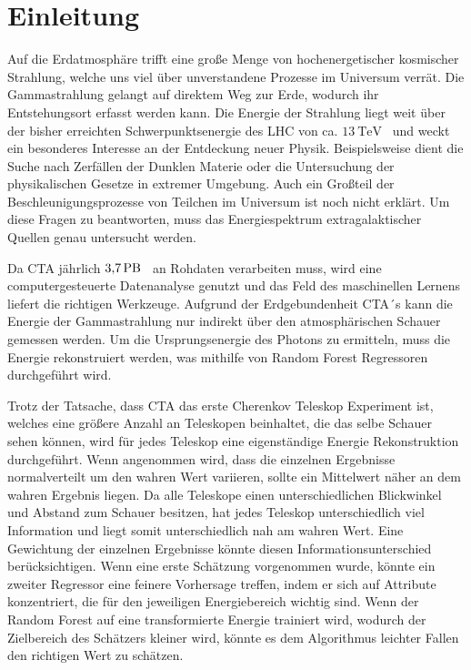 \chapter{Einleitung}

Auf die Erdatmosphäre trifft eine große Menge von hochenergetischer kosmischer Strahlung, welche uns viel über unverstandene
Prozesse im Universum verrät.
Die Gammastrahlung gelangt auf direktem Weg zur Erde, wodurch ihr Entstehungsort erfasst werden kann.
Die Energie der Strahlung liegt weit über der bisher erreichten Schwerpunktsenergie des LHC von ca. $\SI{13}{\tera\eV}$~\cite{LHC} und weckt
ein besonderes Interesse an der Entdeckung neuer Physik.
Beispielsweise dient die Suche nach Zerfällen der Dunklen Materie oder die Untersuchung der physikalischen Gesetze in extremer Umgebung.
Auch ein Großteil der Beschleunigungsprozesse von Teilchen im Universum ist noch nicht erklärt.
Um diese Fragen zu beantworten, muss das Energiespektrum extragalaktischer Quellen genau untersucht werden.

Da CTA jährlich $\SI{3.7}{\peta\byte}$~\cite{Rohdaten} an Rohdaten verarbeiten muss, wird eine computergesteuerte Datenanalyse
genutzt und das Feld des maschinellen Lernens liefert die richtigen Werkzeuge.
Aufgrund der Erdgebundenheit CTA´s kann die Energie der Gammastrahlung nur indirekt über den atmosphärischen Schauer gemessen
werden.
Um die Ursprungsenergie des Photons zu ermitteln, muss die Energie rekonstruiert werden, was mithilfe von Random Forest
Regressoren durchgeführt wird.

Trotz der Tatsache, dass CTA das erste Cherenkov Teleskop Experiment ist, welches eine größere Anzahl an Teleskopen beinhaltet,
die das selbe Schauer sehen können, wird für jedes Teleskop eine eigenständige
Energie Rekonstruktion durchgeführt.
Wenn angenommen wird, dass die einzelnen Ergebnisse normalverteilt um den wahren Wert variieren, sollte ein Mittelwert näher an dem wahren
Ergebnis liegen.
Da alle Teleskope einen unterschiedlichen Blickwinkel und Abstand zum Schauer besitzen, hat jedes Teleskop unterschiedlich viel Information und liegt somit
unterschiedlich nah am wahren Wert.
Eine Gewichtung der einzelnen Ergebnisse könnte diesen Informationsunterschied berücksichtigen.
Wenn eine erste Schätzung vorgenommen wurde, könnte ein zweiter Regressor eine feinere Vorhersage treffen, indem er sich auf Attribute konzentriert, die
für den jeweiligen Energiebereich wichtig sind.
Wenn der Random Forest auf eine transformierte Energie trainiert wird, wodurch der Zielbereich des Schätzers kleiner wird, könnte es dem
Algorithmus leichter Fallen den richtigen Wert zu schätzen.
